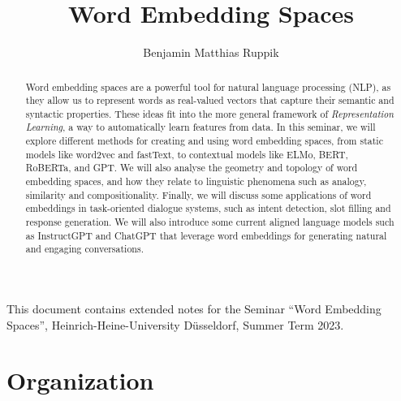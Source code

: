 \documentclass[11pt, a4paper]{amsart}
\title{Word Embedding Spaces}
\author{Benjamin Matthias Ruppik}
\begin{document}
\begin{abstract}
	Word embedding spaces are a powerful tool for natural language processing (NLP), as they allow us to represent words as real-valued vectors that capture their semantic and syntactic properties.
	These ideas fit into the more general framework of \emph{Representation Learning}, a way to automatically learn features from data.
	In this seminar, we will explore different methods for creating and using word embedding spaces, from static models like word2vec and fastText, to contextual models like ELMo, BERT, RoBERTa, and GPT.
	We will also analyse the geometry and topology of word embedding spaces, and how they relate to linguistic phenomena such as analogy, similarity and compositionality.
	Finally, we will discuss some applications of word embeddings in task-oriented dialogue systems, such as intent detection, slot filling and response generation.
	We will also introduce some current aligned language models such as InstructGPT and ChatGPT that leverage word embeddings for generating natural and engaging conversations.
\end{abstract}

\maketitle

This document contains extended notes for the Seminar ``Word Embedding Spaces'', Heinrich-Heine-University D{\"u}sseldorf, Summer Term 2023.

\section*{Organization}
\end{document}
